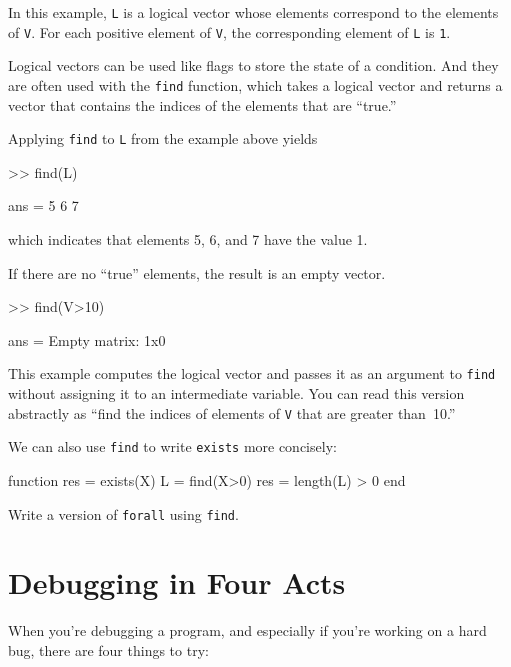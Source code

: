 In this example, \lstinline{L} is a logical vector whose elements
correspond to the elements of \lstinline{V}.  For each positive element of
\lstinline{V}, the corresponding element of \lstinline{L} is \lstinline{1}.

Logical vectors can be used like flags to store the state of
a condition.  And they are often used with the \lstinline{find} function,
which takes a logical vector and returns a vector that contains
the indices of the elements that are ``true.''


Applying \lstinline{find} to \lstinline{L} from the example above yields

\begin{code}
>> find(L)

ans = 5     6     7
\end{code}
which indicates that elements 5, 6, and 7 have the value 1.

If there are no ``true'' elements, the result is an empty vector.

\begin{code}
>> find(V>10)

ans = Empty matrix: 1x0
\end{code}

This example computes the logical vector and passes it as an
argument to \lstinline{find} without assigning it to an intermediate
variable.  You can read this version abstractly as ``find
the indices of elements of \lstinline{V} that are greater than~10.''

We can also use \lstinline{find} to write \lstinline{exists} more concisely:

\begin{code}
function res = exists(X)
    L = find(X>0)
    res = length(L) > 0
end
\end{code}

\begin{ex}
Write a version of \lstinline{forall} using \lstinline{find}.
\end{ex}


\section{Debugging in Four Acts}


When you're debugging a program, and especially if you're working on a hard bug, there are four things to try:

